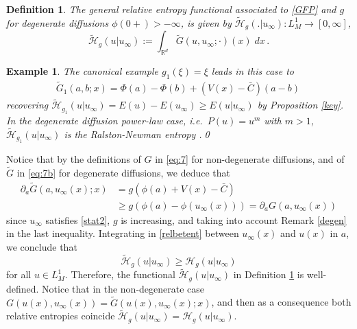 \documentclass[reqno]{amsart}
\newtheorem{definition}[lemma]{Definition}
\newtheorem{example}[lemma]{Example}
\newcommand{\R}{\mathbb{R}}
\newcommand{\uinf}{u_\infty}
\begin{document}
\begin{definition}\label{genrelentropy2}
The general relative entropy functional associated to \eqref{GFP} and $g$ for degenerate diffusions $\phi(0+)>-\infty$, is given by $\widetilde{\mathcal{H}}_g(.|\uinf) :  L^1_M  \to [0,\infty]$,
$$
 \widetilde{\mathcal{H}}_g(u|\uinf)  := \int_{\R^d} \tilde G(u,\uinf;\cdot)(x)\;dx\,.
$$
\end{definition}

\begin{example}\label{Ex:canon-entropy}
The canonical example $g_1(\xi)=\xi$ leads in this case to
\begin{align*}
  \tilde G_1(a,b;x) = \Phi(a)-\Phi(b)+(V(x)-\bar C)(a-b)\,
\end{align*}
recovering $\widetilde{\mathcal{H}}_{g_1}(u|u_\infty)=E(u)-E(u_\infty)\geq E(u|u_\infty)$ by Proposition \ref{key}. In the degenerate diffusion power-law case, i.e.\ $P(u)=u^m$ with $m>1$, $\widetilde{\mathcal{H}}_{g_1}(u|u_\infty)$ is the Ralston-Newman entropy \cite{Ral84,New84}.\qed
\end{example}

Notice that by the definitions of $G$ in \eqref{eq:7} for non-degenerate diffusions, and of $\tilde G$ in \eqref{eq:7b} for degenerate diffusions, we deduce that
\begin{align}\label{relbetent}
\partial_a \tilde G(a,\uinf(x);x) &= g(\phi(a)+V(x)-\bar C) \nonumber\\
&\geq g(\phi(a)-\phi(\uinf(x))) = \partial_a G(a,\uinf(x)) 
\end{align}
since $\uinf$ satisfies \eqref{stat2}, $g$ is increasing, and taking into account Remark \ref{degen} in the last inequality. Integrating in \eqref{relbetent} between $u_\infty(x)$ and $u(x)$ in $a$, we conclude that
$$
\widetilde{\mathcal{H}}_g(u|\uinf)\geq \mathcal{H}_g(u|\uinf)
$$
for all $u\in L^1_M$. Therefore, the functional $\widetilde{\mathcal{H}}_g(u|\uinf)$ in Definition \ref{genrelentropy2} is well-defined. Notice that in the non-degenerate case $G(u(x),u_\infty(x))=\tilde G(u(x),\uinf(x);x)$, and then as a consequence both relative entropies coincide $\widetilde{\mathcal{H}}_g(u|\uinf)=\mathcal{H}_g(u|\uinf)$.
\end{document}

